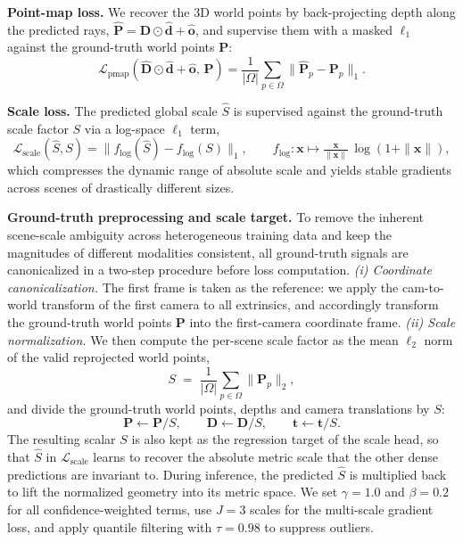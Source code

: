 \noindent\textbf{Point-map loss.}
We recover the 3D world points by back-projecting depth along the predicted rays, $\hat{\mathbf{P}} = \hat{\mathbf{D}}\odot\hat{\mathbf{d}} + \hat{\mathbf{o}}$, and supervise them with a masked $\ell_1$ against the ground-truth world points $\mathbf{P}$:
\begin{equation}
\mathcal{L}_{\text{pmap}}(\hat{\mathbf{D}}\odot\hat{\mathbf{d}}+\hat{\mathbf{o}},\,\mathbf{P}) = \frac{1}{|\Omega|}\sum_{p\in\Omega}\big\|\hat{\mathbf{P}}_p - \mathbf{P}_p \big\|_1.
\end{equation}

\noindent\textbf{Scale loss.}
The predicted global scale $\hat{S}$ is supervised against the ground-truth scale factor $S$ via a log-space $\ell_1$ term,
\begin{equation}
\mathcal{L}_{\text{scale}}(\hat{S},S) = \big\| f_{\log}(\hat{S}) - f_{\log}(S) \big\|_1,\qquad
f_{\log}:\mathbf{x}\mapsto \tfrac{\mathbf{x}}{\|\mathbf{x}\|}\,\log(1+\|\mathbf{x}\|),
\end{equation}
which compresses the dynamic range of absolute scale and yields stable gradients across scenes of drastically different sizes.

\noindent\textbf{Ground-truth preprocessing and scale target.}
To remove the inherent scene-scale ambiguity across heterogeneous training data and keep the magnitudes of different modalities consistent, all ground-truth signals are canonicalized in a two-step procedure before loss computation.
%
\emph{(i) Coordinate canonicalization.} The first frame is taken as the reference: we apply the \mbox{cam-to-world} transform of the first camera to all extrinsics, and accordingly transform the ground-truth world points $\mathbf{P}$ into the first-camera coordinate frame.
%
\emph{(ii) Scale normalization.} We then compute the per-scene scale factor as the mean $\ell_2$ norm of the valid reprojected world points,
\begin{equation}
S \;=\; \frac{1}{|\Omega|}\sum_{p\in\Omega} \|\mathbf{P}_p\|_2,
\label{eq:gt_scale}
\end{equation}
and divide the ground-truth world points, depths and camera translations by $S$:
\begin{equation}
\mathbf{P}\!\leftarrow\!\mathbf{P}/S,\qquad
\mathbf{D}\!\leftarrow\!\mathbf{D}/S,\qquad
\mathbf{t}\!\leftarrow\!\mathbf{t}/S.
\end{equation}
%
The resulting scalar $S$ is also kept as the regression target of the scale head, so that $\hat{S}$ in $\mathcal{L}_{\text{scale}}$ learns to recover the absolute metric scale that the other dense predictions are invariant to. During inference, the predicted $\hat{S}$ is multiplied back to lift the normalized geometry into its metric space.
%
We set $\gamma=1.0$ and $\beta=0.2$ for all confidence-weighted terms, use $J=3$ scales for the multi-scale gradient loss, and apply quantile filtering with $\tau=0.98$ to suppress outliers.

